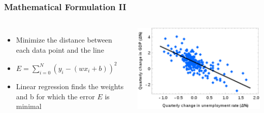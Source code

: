 \begin{frame}
    \frametitle{Mathematical Formulation II}
    \begin{columns}
            \begin{itemize}
                \item Minimize the distance between each data point and the line
                \item $ E = \sum_{i=0}^{N}(y_i - (w x_i + b))^2$
                \item Linear regression finds the weights and b for which the error $E$ is minimal
            \end{itemize}
            \includegraphics[width=1\linewidth]{linreg-pics/lg}\\
    \end{columns}
\end{frame}


